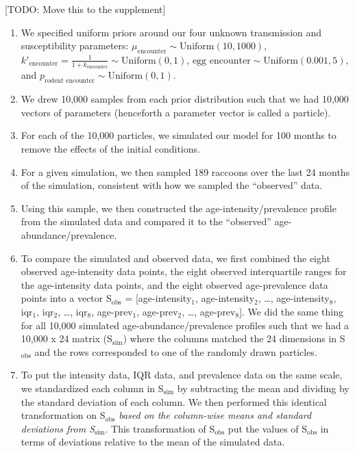 \documentclass[11pt]{article}
\begin{document}
[TODO: Move this to the supplement]
\begin{enumerate}
\def\labelenumi{\arabic{enumi}.}
\item
  We specified uniform priors around our four unknown transmission and
  susceptibility parameters: $\mu_{\text{encounter}} \sim \text{Uniform}(10, 1000)$, $k'_{\text{encounter}} = \frac{1}{1 + k_{\text{encounter}}} \sim \text{Uniform}(0, 1)$, $\text{egg encounter} \sim \text{Uniform}(0.001, 5)$, and $p_{\text{rodent encounter}} \sim \text{Uniform}(0, 1)$.
\item
  We drew 10,000 samples from each prior distribution such that we had
  10,000 vectors of parameters (henceforth a parameter vector is called a particle).
\item
  For each of the 10,000 particles, we simulated our model for 100
  months to remove the effects of the initial conditions.
\item
  For a given simulation, we then sampled 189 raccoons over the last 24
  months of the simulation, consistent with how we sampled the ``observed'' data.
\item
  Using this sample, we then constructed the age-intensity/prevalence
  profile from the simulated data and compared it to the ``observed'' age-
  abundance/prevalence.
\item
  To compare the simulated and observed data, we first combined the
  eight observed age-intensity data points, the eight observed interquartile ranges for the age-intensity data points, and the eight observed
  age-prevalence data points into a vector S$_\text{obs}$ = [age-intensity$_1$,
  age-intensity$_2$, \ldots{}, age-intensity$_8$, iqr$_1$, iqr$_2$, \ldots{}, iqr$_8$, age-prev$_1$,
  age-prev$_2$, \ldots{}, age-prev$_8$]. We did the same thing for all
  10,000 simulated age-abundance/prevalence profiles such that we had a
  10,000 x 24 matrix (S$_\text{sim}$) where the columns matched the 24 dimensions
  in S$_\text{obs}$ and the rows corresponded to one of the randomly drawn
  particles.
\item
  To put the intensity data, IQR data, and prevalence data on the same
  scale, we standardized each column in S$_\text{sim}$ by subtracting the mean
  and dividing by the standard deviation of each column. We then
  performed this identical transformation on S$_\text{obs}$ \emph{based on the
  column-wise means and standard deviations from S$_\text{sim}$}. This
  transformation of S$_\text{obs}$ put the values of S$_\text{obs}$ in terms of
  deviations relative to the mean of the simulated data.

\end{enumerate}
\end{document}
